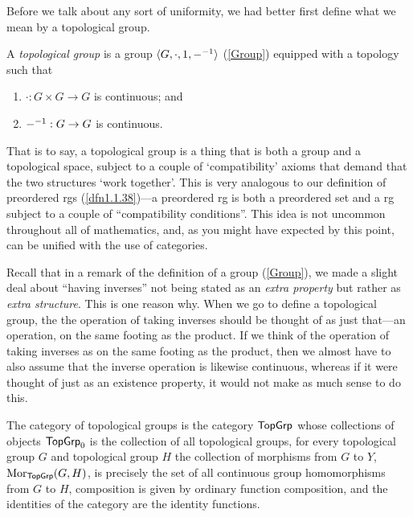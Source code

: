 Before we talk about any sort of uniformity, we had better first define what we mean by a topological group.
\begin{dfn}\label{TopologicalGroup}
A \emph{topological group} is a group $\langle G,\cdot ,1,{-} ^{-1}\rangle$ (\cref{Group}) equipped with a topology such that
\begin{enumerate}
\item $\cdot :G\times G\rightarrow G$ is continuous; and
\item ${-} ^{-1}:G\rightarrow G$ is continuous.
\end{enumerate}
\begin{rmk}
That is to say, a topological group is a thing that is both a group and a topological space, subject to a couple of `compatibility' axioms that demand that the two structures `work together'.  This is very analogous to our definition of preordered rgs (\cref{dfn1.1.38})---a preordered rg is both a preordered set and a rg subject to a couple of ``compatibility conditions''.  This idea is not uncommon throughout all of mathematics, and, as you might have expected by this point, can be unified with the use of categories.
\end{rmk}
\begin{rmk}
Recall that in a remark of the definition of a group (\cref{Group}), we made a slight deal about ``having inverses'' not being stated as an \emph{extra property} but rather as \emph{extra structure}.  This is one reason why.  When we go to define a topological group, the the operation of taking inverses should be thought of as just that---an operation, on the same footing as the product.  If we think of the operation of taking inverses as on the same footing as the product, then we almost have to also assume that the inverse operation is likewise continuous, whereas if it were thought of just as an existence property, it would not make as much sense to do this.
\end{rmk}
\end{dfn}
\begin{exm}
The category of topological groups is the category $\Top \Grp$\index[notation]{$\Top \Grp$} whose collections of objects $\mathsf{Top} \mathsf{Grp} _0$ is the collection of all topological groups, for every topological group $G$ and topological group $H$ the collection of morphisms from $G$ to $Y$, $\operatorname{Mor} _{\mathsf{Top} \mathsf{Grp}}(G,H)$, is precisely the set of all continuous group homomorphisms from $G$ to $H$, composition is given by ordinary function composition, and the identities of the category are the identity functions.
\end{exm}
